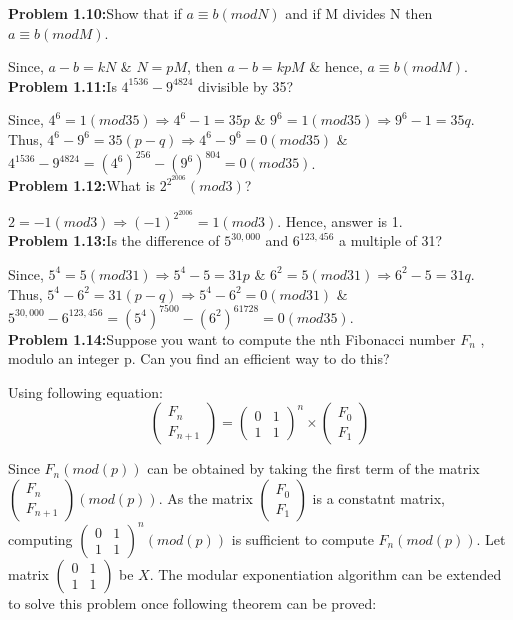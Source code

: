 \documentclass[11pt]{article}
\begin{document}
	\textbf{Problem 1.10:}Show that if $a \equiv b (mod N)$ and if M divides N then $a \equiv b (mod M)$.
	
	Since, $a - b = kN$ \& $N = pM$, then $a - b = kpM$ \& hence, $a \equiv b (mod M)$.\\
	
	\textbf{Problem 1.11:}Is $4^{1536} - 9^{4824}$ divisible by 35?
	
	Since, $4^6 = 1 (mod 35) \Rightarrow 4^6 - 1 = 35p$ \& $9^6 = 1 (mod 35) \Rightarrow 9^6 - 1 = 35q$. Thus, $4^6 - 9^6 = 35(p-q) \Rightarrow 4^6 - 9^6 = 0(mod 35)$ \& $4^{1536} - 9^{4824} = (4^6)^{256} - (9^6)^{804} = 0(mod 35)$.\\
	
	\textbf{Problem 1.12:}What is $2^{2^{2006}}(mod 3)$?
	
	$2 = -1 (mod 3) \Rightarrow (-1)^{2^{2006}} = 1 (mod 3)$. Hence, answer is 1.\\
	
	\textbf{Problem 1.13:}Is the difference of $5^{30,000}$ and $6^{123,456}$ a multiple of 31?
	
	Since, $5^4 = 5 (mod 31) \Rightarrow 5^4 - 5 = 31p$ \& $6^2 = 5 (mod 31) \Rightarrow 6^2 - 5 = 31q$. Thus, $5^4 - 6^2 = 31(p-q) \Rightarrow 5^4 - 6^2 = 0(mod 31)$ \& $5^{30,000} - 6^{123,456} = (5^4)^{7500} - (6^2)^{61728} = 0(mod 35)$.\\
		
	\textbf{Problem 1.14:}Suppose you want to compute the nth Fibonacci number $F_n$ , modulo an integer p. Can you find an efficient way to do this?
	
	Using following equation:
	$$\begin{pmatrix}
	F_n\\F_{n+1}
	\end{pmatrix} =
	\begin{pmatrix}
	0 & 1\\1 & 1
	\end{pmatrix}^n \times 
	\begin{pmatrix}
	F_0\\F_1
	\end{pmatrix}$$
	
	Since $F_n(mod (p))$ can be obtained by taking the first term of the matrix $\begin{pmatrix}F_n\\F_{n+1}
	\end{pmatrix}(mod (p))$.  As the matrix $\begin{pmatrix}F_0\\F_1\end{pmatrix}$ is a constatnt matrix, computing $\begin{pmatrix}0 & 1\\1 & 1 \end{pmatrix}^n (mod(p))$ is sufficient to compute $F_n(mod(p))$. Let matrix $\begin{pmatrix}0 & 1\\1 & 1 \end{pmatrix}$ be $X$. The modular exponentiation algorithm can be extended to solve this problem once following theorem can be proved:
	
\end{document}
